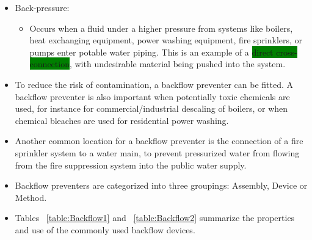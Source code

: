 \begin{itemize}[itemsep=0.5em,parsep=-0.5em]
\item Back-pressure: 
\begin{itemize}
\item Occurs when a fluid under a higher pressure from systems like boilers, heat exchanging equipment, power washing equipment, fire sprinklers, or pumps enter potable water piping. This is an example of a \colorbox{green}{direct cross-connection}, with undesirable material being pushed into the system.
\end{itemize}
\item To reduce the risk of contamination, a backflow preventer can be fitted. A backflow preventer is also important when potentially toxic chemicals are used, for instance for commercial/industrial descaling of boilers, or when chemical bleaches are used for residential power washing.
\item Another common location for a backflow preventer is the connection of a fire sprinkler system to a water main, to prevent pressurized water from flowing from the fire suppression system into the public water supply. 
\item Backflow preventers are categorized into three groupings: Assembly, Device or Method. 
\item Tables ~\ref{table:Backflow1} and ~\ref{table:Backflow2} summarize the properties and use of the commonly used backflow devices. 
\end{itemize}

